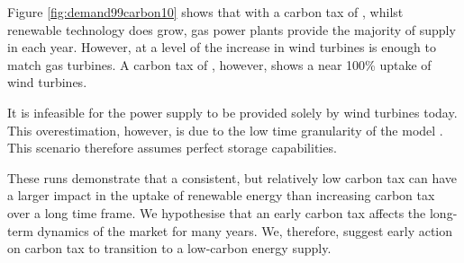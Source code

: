 Figure \ref{fig:demand99carbon10} shows that with a carbon tax of , whilst renewable technology does grow, gas power plants provide the majority of supply in each year. However, at a level of  the increase in wind turbines is enough to match gas turbines. A carbon tax of , however, shows a near 100\% uptake of wind turbines.

It is infeasible for the power supply to be provided solely by wind turbines today. This overestimation, however, is due to the low time granularity of the model \cite{Collins2017}. This scenario therefore assumes perfect storage capabilities.



These runs demonstrate that a consistent, but relatively low carbon tax can have a larger impact in the uptake of renewable energy than increasing carbon tax over a long time frame. We hypothesise that an early carbon tax affects the long-term dynamics of the market for many years. We, therefore, suggest early action on carbon tax to transition to a low-carbon energy supply.


%






